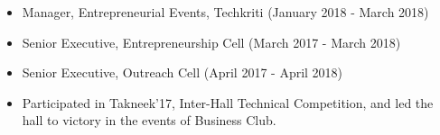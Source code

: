 

{\fontsize{10pt}{1em}\bodyfontlight\upshape\color{text}
\begin{itemize}[leftmargin=0.4cm]
  \itemsep -0.3em
  \item Manager, Entrepreneurial Events, Techkriti (January 2018 - March 2018)
  \item Senior Executive, Entrepreneurship Cell (March 2017 - March 2018)
  \item Senior Executive, Outreach Cell (April 2017 - April 2018)
  \item Participated in Takneek’17, Inter-Hall Technical Competition, and led the hall to victory in the events of Business Club.
\end{itemize}
}